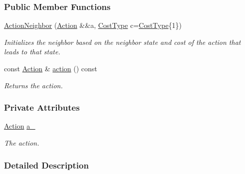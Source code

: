\subsubsection*{Public Member Functions}
\begin{DoxyCompactItemize}
\item 
\hyperlink{structslb_1_1core_1_1sb_1_1ActionNeighbor_ad022edd7e76461d64173c3531330c5af}{Action\+Neighbor} (\hyperlink{structslb_1_1core_1_1sb_1_1ActionNeighbor_ae3ea9c18fb03dec73db239df85a86e57}{Action} \&\&a, \hyperlink{structslb_1_1core_1_1sb_1_1Cost_a383726dcecbf69f396aa3a6d34b60278}{Cost\+Type} c=\hyperlink{structslb_1_1core_1_1sb_1_1Cost_a383726dcecbf69f396aa3a6d34b60278}{Cost\+Type}\{1\})
\begin{DoxyCompactList}\small\item\em Initializes the neighbor based on the neighbor state and cost of the action that leads to that state. \end{DoxyCompactList}\item 
const \hyperlink{structslb_1_1core_1_1sb_1_1ActionNeighbor_ae3ea9c18fb03dec73db239df85a86e57}{Action} \& \hyperlink{structslb_1_1core_1_1sb_1_1ActionNeighbor_aaaae0072af661ab1851132beca4cea3c}{action} () const 
\begin{DoxyCompactList}\small\item\em Returns the action. \end{DoxyCompactList}\end{DoxyCompactItemize}
\subsubsection*{Private Attributes}
\begin{DoxyCompactItemize}
\item 
\hyperlink{structslb_1_1core_1_1sb_1_1ActionNeighbor_ae3ea9c18fb03dec73db239df85a86e57}{Action} \hyperlink{structslb_1_1core_1_1sb_1_1ActionNeighbor_a2b653bb2c247e16fe4571fe56e6832d4}{a\+\_\+}\hypertarget{structslb_1_1core_1_1sb_1_1ActionNeighbor_a2b653bb2c247e16fe4571fe56e6832d4}{}\label{structslb_1_1core_1_1sb_1_1ActionNeighbor_a2b653bb2c247e16fe4571fe56e6832d4}

\begin{DoxyCompactList}\small\item\em The action. \end{DoxyCompactList}\end{DoxyCompactItemize}


\subsubsection{Detailed Description}
